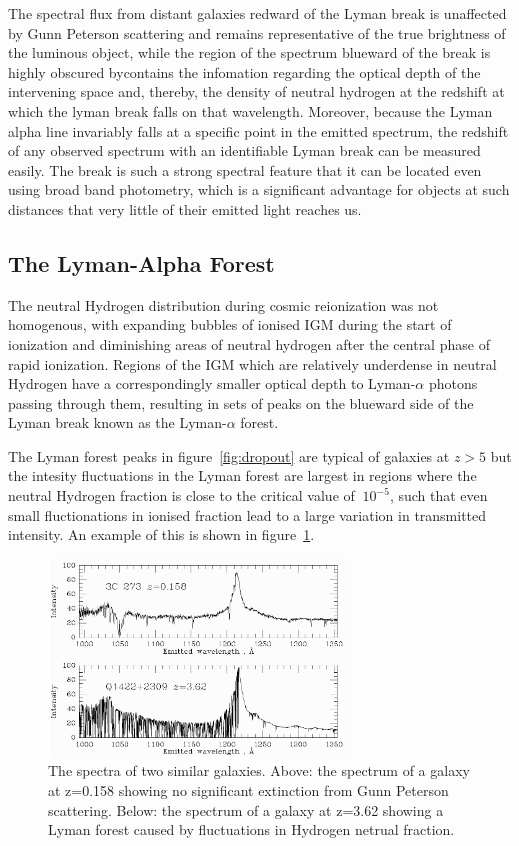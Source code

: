 		The spectral flux from distant galaxies redward of the Lyman break is unaffected by Gunn Peterson scattering and remains representative of the true brightness of the luminous object, while the region of the spectrum blueward of the break is highly obscured bycontains the infomation regarding the optical depth of the intervening space and, thereby, the density of neutral hydrogen at the redshift at which the lyman break falls on that wavelength. Moreover, because the Lyman alpha line invariably falls at a specific point in the emitted spectrum, the redshift of any observed spectrum with an identifiable Lyman break can be measured easily. The break is such a strong spectral feature that it can be located even using broad band photometry, which is a significant advantage for objects at such distances that very little of their emitted light reaches us.

	\subsection{The Lyman-Alpha Forest} %
	\label{sub:the_lyman_alpha_forest}
		The neutral Hydrogen distribution during cosmic reionization was not homogenous, with expanding bubbles of ionised IGM during the start of ionization and diminishing areas of neutral hydrogen after the central phase of rapid ionization. Regions of the IGM which are relatively underdense in neutral Hydrogen have a correspondingly smaller optical depth to Lyman-$\alpha$ photons passing through them, resulting in sets of peaks on the blueward side of the Lyman break known as the Lyman-$\alpha$ forest.

		The Lyman forest peaks in figure~\ref{fig:dropout} are typical of galaxies at $z>5$ but the intesity fluctuations in the Lyman forest are largest in regions where the neutral Hydrogen fraction is close to the critical value of $~10^{-5}$, such that even small fluctionations in ionised fraction lead to a large variation in transmitted intensity. An example of this is shown in figure~\ref{fig:forest}.
		\begin{figure}[h]
			\centering
			\includegraphics[width=0.7\textwidth]{../Images/forest.png}
			\caption{The spectra of two similar galaxies. Above: the spectrum of a galaxy at z=0.158 showing no significant extinction from Gunn Peterson scattering. Below: the spectrum of a galaxy at z=3.62 showing a Lyman forest caused by fluctuations in Hydrogen netrual fraction.}
			\label{fig:forest}
		\end{figure}

